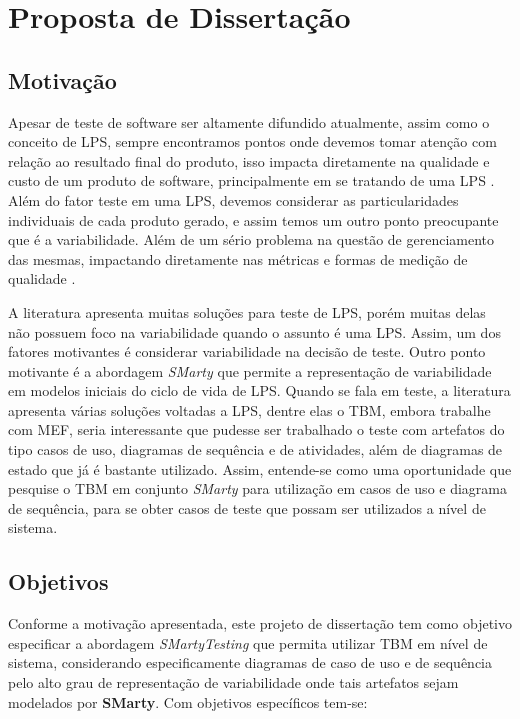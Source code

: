 \chapter{Proposta de Dissertação}
\label{sec:proposta}


\section{Motivação}
\label{sec:repres_e}
Apesar de teste de software ser altamente difundido atualmente, assim como o conceito de LPS, sempre encontramos pontos onde devemos tomar atenção com relação ao resultado final do produto, isso impacta diretamente na qualidade e custo de um produto de software, principalmente em se tratando de uma LPS \cite{engstrom2011testing}. Além do fator teste em uma LPS, devemos considerar as particularidades individuais de cada produto gerado, e assim temos um outro ponto preocupante que é a variabilidade. Além de um sério problema na questão de gerenciamento das mesmas, impactando diretamente nas métricas e formas de medição de qualidade \cite{junior2013systematic}. 

A literatura apresenta muitas soluções para teste de LPS, porém muitas delas não possuem foco na variabilidade quando o assunto é uma LPS. Assim, um dos fatores motivantes é considerar variabilidade na decisão de teste. Outro ponto motivante é a abordagem \textit{SMarty} \cite{junior2010systematic} que permite a representação de variabilidade em modelos iniciais do ciclo de vida de LPS. Quando se fala em teste, a literatura apresenta várias soluções voltadas a LPS, dentre elas o TBM, embora trabalhe com MEF, seria interessante que pudesse ser trabalhado o teste com artefatos do tipo casos de uso, diagramas de sequência e de atividades, além de diagramas de estado que já é bastante utilizado. Assim, entende-se como uma oportunidade que pesquise o TBM em conjunto \textit{SMarty} para utilização em casos de uso e diagrama de sequência, para se obter casos de teste que possam ser utilizados a nível de sistema.
\newpage
\section{Objetivos}
\label{sec:repres}
Conforme a motivação apresentada, este projeto de dissertação tem como objetivo especificar a abordagem \textit{SMartyTesting} que permita utilizar TBM em nível de sistema, considerando especificamente diagramas de caso de uso e de sequência pelo alto grau de representação de variabilidade onde tais artefatos sejam modelados por \textbf{SMarty}. Com objetivos específicos tem-se:

